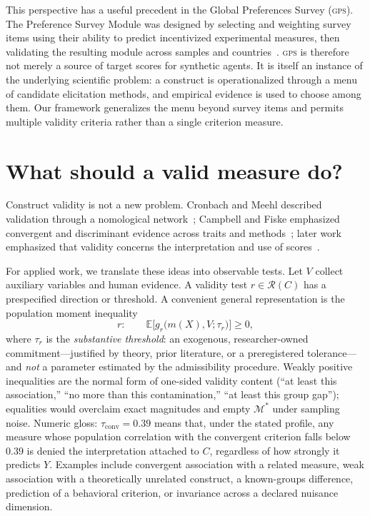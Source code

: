 \documentclass[10pt,letterpaper]{article}
\newcommand{\GPS}{\textsc{gps}}
\newcommand{\M}{\ensuremath{\mathcal{M}}}
\newcommand{\E}{\mathbb{E}}
\newcommand{\Rset}{\mathcal{R}}
\begin{document}
This perspective has a useful precedent in the Global Preferences Survey (\GPS{}).
The Preference Survey Module was designed by selecting and weighting survey items using their ability to predict incentivized experimental measures, then validating the resulting module across samples and countries~\cite{falk2018,falk2023}.
\GPS{} is therefore not merely a source of target scores for synthetic agents.
It is itself an instance of the underlying scientific problem: a construct is operationalized through a menu of candidate elicitation methods, and empirical evidence is used to choose among them.
Our framework generalizes the menu beyond survey items and permits multiple validity criteria rather than a single criterion measure.

\section{What should a valid measure do?}
\label{sec:framework}
Construct validity is not a new problem.
Cronbach and Meehl described validation through a nomological network~\cite{cronbach1955}; Campbell and Fiske emphasized convergent and discriminant evidence across traits and methods~\cite{campbell1959}; later work emphasized that validity concerns the interpretation and use of scores~\cite{messick1995,kane2013,borsboom2004}.

For applied work, we translate these ideas into observable tests.
Let $V$ collect auxiliary variables and human evidence.
A validity test $r\in\Rset(C)$ has a prespecified direction or threshold.
A convenient general representation is the population moment inequality
\begin{equation}
r:\qquad \E\bigl[g_r\bigl(m(X),V;\tau_r\bigr)\bigr]\ge 0,
\label{eq:restriction}
\end{equation}
where $\tau_r$ is the \emph{substantive threshold}: an exogenous, researcher-owned commitment---justified by theory, prior literature, or a preregistered tolerance---and \emph{not} a parameter estimated by the admissibility procedure.
Weakly positive inequalities are the normal form of one-sided validity content (``at least this association,'' ``no more than this contamination,'' ``at least this group gap''); equalities would overclaim exact magnitudes and empty $\M^*$ under sampling noise.
Numeric gloss: $\tau_{\mathrm{conv}}=0.39$ means that, under the stated profile, any measure whose population correlation with the convergent criterion falls below $0.39$ is denied the interpretation attached to $C$, regardless of how strongly it predicts $Y$.
Examples include convergent association with a related measure, weak association with a theoretically unrelated construct, a known-groups difference, prediction of a behavioral criterion, or invariance across a declared nuisance dimension.
\end{document}
